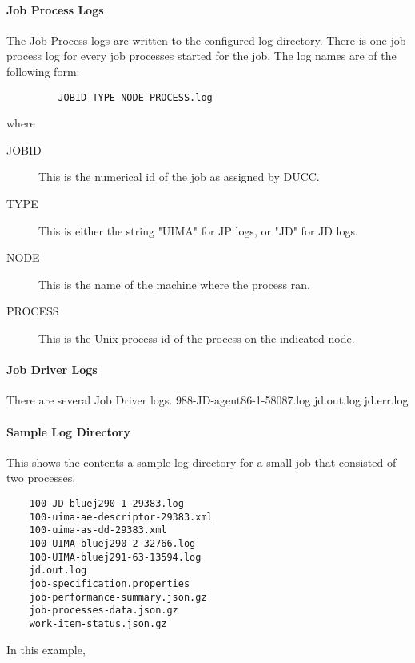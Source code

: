 \paragraph{Job Process Logs}
The Job Process logs are written to the configured log directory.  There is one job process log
for every job processes started for the job.  The log names are of the following form:
\begin{verbatim}
         JOBID-TYPE-NODE-PROCESS.log 
\end{verbatim}
where 
\begin{description}
\item[JOBID] This is the numerical id of the job as assigned by DUCC.
\item[TYPE] This is either the string "UIMA" for JP logs, or "JD" for JD logs.
\item[NODE] This is the name of the machine where the process ran.
\item[PROCESS] This is the Unix process id of the process on the indicated node.
\end{description}

\paragraph{Job Driver Logs}
There are several Job Driver logs.
   988-JD-agent86-1-58087.log
   jd.out.log
   jd.err.log

\paragraph{Sample Log Directory}
This shows the contents a sample log directory for a small job that consisted of two processes.

\begin{verbatim}
    100-JD-bluej290-1-29383.log 
    100-uima-ae-descriptor-29383.xml 
    100-uima-as-dd-29383.xml 
    100-UIMA-bluej290-2-32766.log 
    100-UIMA-bluej291-63-13594.log 
    jd.out.log 
    job-specification.properties 
    job-performance-summary.json.gz
    job-processes-data.json.gz
    work-item-status.json.gz

\end{verbatim}

In this example, 

